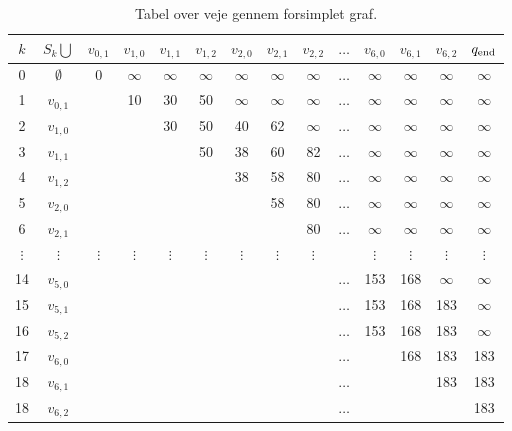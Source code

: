 \begin{table}[H]
\centering
\begin{tabular}{|c|c|c|c|c|c|c|c|c|c|c|c|c|c|} 
\hline
$k$ & $S_{k} \bigcup$ & $v_{0,1}$ & $v_{1,0}$ & $v_{1,1}$ & $v_{1,2}$ & $v_{2,0}$ & $v_{2,1}$ & $v_{2,2}$ & $\ldots$ & $v_{6,0}$ & $v_{6,1}$ & $v_{6,2}$ & $q_{\textrm{end}}$ \\
\hline
0 & $\emptyset$ & 0 & $\infty$ & $\infty$ & $\infty$ & $\infty$ & $\infty$ & $\infty$ & $\ldots$ & $\infty$ & $\infty$ & $\infty$ & $\infty$ \\ 
1 & $v_{0,1}$ & & 10 & 30 & 50 & $\infty$ & $\infty$ & $\infty$ & $\ldots$ & $\infty$ & $\infty$ & $\infty$ & $\infty$\\ 
2 & $v_{1,0}$ & & & 30 & 50 & 40 & 62 & $\infty$ & $\ldots$ & $\infty$ & $\infty$ & $\infty$ & $\infty$\\ 
3 & $v_{1,1}$ & & & & 50 & 38 & 60 & 82 & $\ldots$ & $\infty$ & $\infty$ & $\infty$ & $\infty$\\
4 & $v_{1,2}$ & & & & & 38 & 58 & 80 & $\ldots$ & $\infty$ & $\infty$ & $\infty$ & $\infty$\\ 
5 & $v_{2,0}$ & & & & & & 58 & 80 & $\ldots$ & $\infty$ & $\infty$ & $\infty$ & $\infty$\\ 
6 & $v_{2,1}$ & & & & & & & 80 & $\ldots$ & $\infty$ & $\infty$ & $\infty$ & $\infty$\\  
$\vdots$ & $\vdots$ & $\vdots$ & $\vdots$ & $\vdots$ & $\vdots$ & $\vdots$ & $\vdots$ & $\vdots$ &  & $\vdots$ & $\vdots$ & $\vdots$ & $\vdots$\\ 
14 & $v_{5,0}$ &  &  &  &  &  &  &  & $\ldots$ & 153 & 168 & $\infty$ & $\infty$\\ 
15 & $v_{5,1}$ &  &  &  &  &  &  &  & $\ldots$ & 153 & 168 & 183 & $\infty$\\ 
16 & $v_{5,2}$ &  &  &  &  &  &  &  & $\ldots$ & 153 & 168 & 183 & $\infty$\\ 
17 & $v_{6,0}$ &  &  &  &  &  &  &  & $\ldots$ &  & 168 & 183 & 183\\ 
18 & $v_{6,1}$ &  &  &  &  &  &  &  & $\ldots$ &  &  & 183 & 183\\ 
18 & $v_{6,2}$ &  &  &  &  &  &  &  & $\ldots$ &  &  &  & 183\\ 
\hline
\end{tabular}
\caption{Tabel over veje gennem forsimplet graf.}
\label{table:forsimplet_graf}
\end{table}
